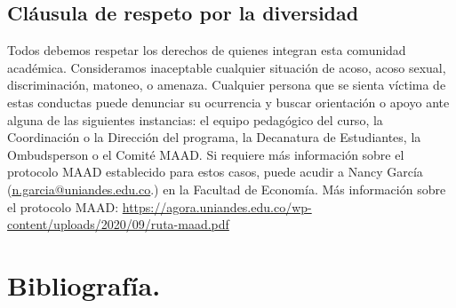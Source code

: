 \documentclass[12pt]{article}
\begin{document}
\subsection*{Cláusula de respeto por la diversidad}

Todos debemos respetar los derechos de quienes integran esta comunidad académica. Consideramos inaceptable cualquier situación de acoso, acoso sexual, discriminación, matoneo, o amenaza. Cualquier persona que se sienta víctima de estas conductas puede denunciar su ocurrencia y buscar orientación o apoyo ante alguna de las siguientes instancias: el equipo pedagógico del curso, la Coordinación o la Dirección del programa, la Decanatura de Estudiantes, la Ombudsperson o el Comité MAAD. Si requiere más información sobre el protocolo MAAD establecido para estos casos, puede acudir a Nancy García (\href{mailto:n.garcia@uniandes.edu.co}{\underline{n.garcia@uniandes.edu.co}}.) en la Facultad de Economía. Más información sobre el protocolo MAAD: \href{https://agora.uniandes.edu.co/wp-content/uploads/2020/09/ruta-maad.pdf}{https://agora.uniandes.edu.co/wp-content/uploads/2020/09/ruta-maad.pdf}


\section*{Bibliografía.}
\end{document}
